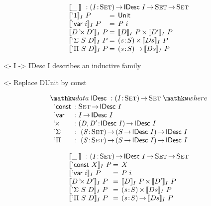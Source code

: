 \documentclass[preprint, authoryear]{sigplanconf}
\newenvironment{structure}{\footnotesize\verbatim}{\endverbatim}
\begin{document}
\[\stk{
\idescop{\_\:}{}{} : \PI{\V{I}}{\Set} \IDesc{I} \To \Set \To \Set          \\
\begin{array}{@{}l@{\:=\:\:}ll}
\idescop{\DUnit}{I}{P}        &  \Unit                                       \\
\idescop{\DVar{i}}{I}{P}      &  P~i                                         \\
\idescop{\DProd{D}{D'}}{I}{P} &  \TIMES{\idescop{D}{I}{P}}{\idescop{D'}{I}{P}}       \\
\idescop{\DSigma{S}{D}}{I}{P} &  \SIGMA{\V{s}}{S} \idescop{D s}{I}{P}                \\
\idescop{\DPi{S}{D}}{I}{P}    &  \PI{\V{s}}{S} \idescop{D s}{I}{P}            
\end{array}
}\]

\begin{structure}
<- I -> IDesc I describes an inductive family
\end{structure}

\begin{structure}
<- Replace DUnit by const
\end{structure}


\[
\stk{
\data \IDesc{} : \PI{\V{I}}{\Set} \Set \where \\
\;\;\begin{array}{@{}l@{\::\:}l@{\quad}l}
    \DConst{}       & \Set \To \IDesc{I}                                \\
    \DVar{}         & I \To \IDesc{I}                                   \\
    \DProd{}{}      & \PI{\V{D}, \V{D'}}{\IDesc{I}} \IDesc{I}           \\
    \DSigma         & \PI{\V{S}}{\Set} \PIS{S \To \IDesc{I}} \IDesc{I}  \\
    \DPi            & \PI{\V{S}}{\Set} \PIS{S \To \IDesc{I}} \IDesc{I} 
\end{array}
}
\]


\[\stk{
\idescop{\_\:}{}{} : \PI{\V{I}}{\Set} \IDesc{I} \To \Set \To \Set                  \\
\begin{array}{@{}l@{\:=\:\:}ll}
\idescop{\DConst{X}}{I}{P}    &  X                                                   \\
\idescop{\DVar{i}}{I}{P}      &  P~i                                                 \\
\idescop{\DProd{D}{D'}}{I}{P} &  \TIMES{\idescop{D}{I}{P}}{\idescop{D'}{I}{P}}       \\
\idescop{\DSigma{S}{D}}{I}{P} &  \SIGMA{\V{s}}{S} \idescop{D s}{I}{P}                    \\
\idescop{\DPi{S}{D}}{I}{P}    &  \PI{\V{s}}{S} \idescop{D s}{I}{P}            
\end{array}
}\]
\end{document}
